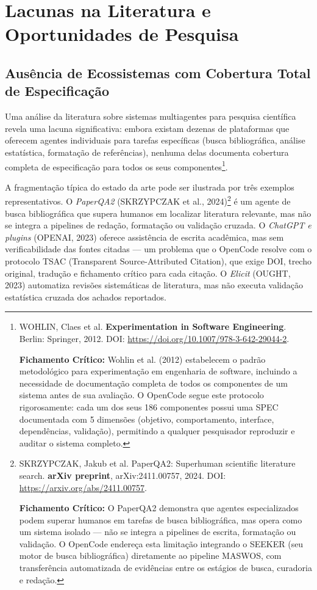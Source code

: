 
\section{Lacunas na Literatura e Oportunidades de Pesquisa}

\subsection{Ausência de Ecossistemas com Cobertura Total de Especificação}

Uma análise da literatura sobre sistemas multiagentes para pesquisa científica revela uma lacuna significativa: embora existam dezenas de plataformas que oferecem agentes individuais para tarefas específicas (busca bibliográfica, análise estatística, formatação de referências), nenhuma delas documenta cobertura completa de especificação para todos os seus componentes\footnote{
  WOHLIN, Claes et al. \textbf{Experimentation in Software Engineering}. Berlin: Springer, 2012. DOI: \url{https://doi.org/10.1007/978-3-642-29044-2}.

  \textbf{Fichamento Crítico:} Wohlin et al. (2012) estabelecem o padrão metodológico para experimentação em engenharia de software, incluindo a necessidade de documentação completa de todos os componentes de um sistema antes de sua avaliação. O OpenCode segue este protocolo rigorosamente: cada um dos seus 186 componentes possui uma SPEC documentada com 5 dimensões (objetivo, comportamento, interface, dependências, validação), permitindo a qualquer pesquisador reproduzir e auditar o sistema completo.
}.

A fragmentação típica do estado da arte pode ser ilustrada por três exemplos representativos. O \textit{PaperQA2} (SKRZYPCZAK et al., 2024)\footnote{
  SKRZYPCZAK, Jakub et al. PaperQA2: Superhuman scientific literature search. \textbf{arXiv preprint}, arXiv:2411.00757, 2024. DOI: \url{https://arxiv.org/abs/2411.00757}.

  \textbf{Fichamento Crítico:} O PaperQA2 demonstra que agentes especializados podem superar humanos em tarefas de busca bibliográfica, mas opera como um sistema isolado --- não se integra a pipelines de escrita, formatação ou validação. O OpenCode endereça esta limitação integrando o SEEKER (seu motor de busca bibliográfica) diretamente ao pipeline MASWOS, com transferência automatizada de evidências entre os estágios de busca, curadoria e redação.
} é um agente de busca bibliográfica que supera humanos em localizar literatura relevante, mas não se integra a pipelines de redação, formatação ou validação cruzada. O \textit{ChatGPT e plugins} (OPENAI, 2023) oferece assistência de escrita acadêmica, mas sem verificabilidade das fontes citadas --- um problema que o OpenCode resolve com o protocolo TSAC (Transparent Source-Attributed Citation), que exige DOI, trecho original, tradução e fichamento crítico para cada citação. O \textit{Elicit} (OUGHT, 2023) automatiza revisões sistemáticas de literatura, mas não executa validação estatística cruzada dos achados reportados.

